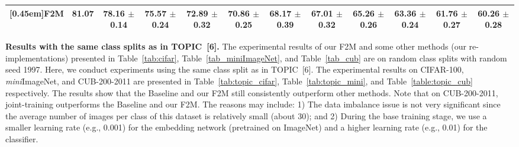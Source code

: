\documentclass{article}
\begin{document}
\begin{table*}[ht]
{\begin{tabular}{lccccccccccc}
  \rule{0pt}{5ex}\multirow{1}{*}[0.45em]{\textbf{F2M}}                                   & \multirow{1}{*}[0.5em]{\textbf{81.07}} & \shortstack[r]{\textbf{78.16} \\ $\bm\pm$ \textbf{0.14}} & \shortstack[r]{\textbf{75.57} \\ $\bm\pm$ \textbf{0.24}} & \shortstack[r]{\textbf{72.89} \\ $\bm\pm$ \textbf{0.32}} & \shortstack[r]{\textbf{70.86} \\ $\bm\pm$ \textbf{0.25}} & \shortstack[r]{\textbf{68.17} \\ $\bm\pm $ \textbf{0.39}} & \shortstack[r]{\textbf{67.01} \\ $\bm\pm$ \textbf{0.32}} & \shortstack[r]{\textbf{65.26} \\ $\bm\pm$ \textbf{0.26}} & \shortstack[r]{\textbf{63.36} \\ $\bm\pm$ \textbf{0.24}} & \shortstack[r]{\textbf{61.76} \\ $\bm\pm$ \textbf{0.27}}   & \shortstack[r]{\textbf{60.26} \\ $\bm\pm$ \textbf{0.28}} \\
  \bottomrule
\end{tabular}
}
\end{table*} 

\textbf{Results with the same class splits as in TOPIC~[6].}
The experimental results of our F2M and some other methods (our re-implementations) presented in Table~\ref{tab:cifar}, Table~\ref{tab_miniImageNet}, and Table~\ref{tab_cub} are on random class splits with random seed 1997. Here, we conduct experiments using the same class split as in TOPIC~[6]. The experimental results on CIFAR-100, \emph{mini}ImageNet, and CUB-200-2011 are presented in Table~\ref{tab:topic_cifar}, Table~\ref{tab:topic_mini}, and Table~\ref{table:topic_cub} respectively. The results show that 
the Baseline and our F2M still consistently outperform other methods. 
Note that on CUB-200-2011, joint-training outperforms the Baseline and our F2M. The reasons may include: 1) The data imbalance issue is not very significant since the average number of images per class of this dataset is relatively small (about 30); and 2) During the base training stage, we use a smaller learning rate (e.g., 0.001) for the embedding network (pretrained on ImageNet) and a higher learning rate (e.g., 0.01) for the classifier.
\end{document}
